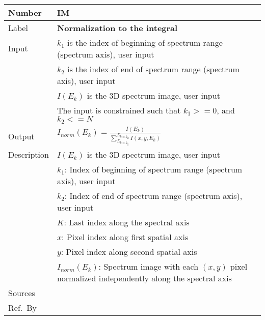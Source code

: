 \documentclass[12pt]{article}
\newcommand{\colAwidth}{0.13\textwidth}
\newcommand{\colBwidth}{0.82\textwidth}
\newcounter{instnum} %
\begin{document}
~\newline


\noindent
\begin{minipage}{\textwidth}
	\renewcommand*{\arraystretch}{1.5}
	\begin{tabular}{| p{\colAwidth} | p{\colBwidth}|}
		  \hline
		  \rowcolor[gray]{0.9}
		  Number& IM{instnum}\theinstnum \label{normalization}\\
		  \hline
		  Label& \bf Normalization to the integral\\
		  \hline
		  Input& $k_1$  is the index of beginning of spectrum range (spectrum axis), user input\\
		  & $k_2$ is the index of end of spectrum range (spectrum axis), user input\\
		  & $I(E_k)$ is the 3D spectrum image, user input\\
		  & The input is constrained such that $k_1 >= 0$, and $k_2 <= N$\\
		  \hline
		  Output& $I_{norm}(E_k)=\frac{I(E_k)}{\sum_{E_{k=k_1}}^{E_{k=k_2}} I(x,y,E_k)}$\\
		  \hline
		  Description&$I(E_k)$ is the 3D spectrum image, user input\\
		  &$k_1$: Index of beginning of spectrum range (spectrum axis), user input\\
		  &$k_2$: Index of end of spectrum range (spectrum axis), user input\\
		  &$K$: Last index along the spectral axis\\
		  &$x$: Pixel index along first spatial axis\\
		  &$y$: Pixel index along second spatial axis\\
		  &$I_{norm}(E_k)$: Spectrum image with each $(x,y)$ pixel normalized independently along the spectral axis\\
		  \hline
		  Sources&\\
		  \hline
		  Ref.\ By &\\
		  \hline
	\end{tabular}
\end{minipage}\\

~\newline

\end{document}
